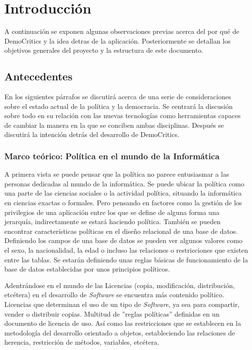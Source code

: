 \newpage
\thispagestyle{sectioned}
\chapter{Introducción}

A continuación se exponen algunas observaciones previas acerca del por qué de DemoCritics y la idea detras de la aplicación. Posteriormente se detallan los objetivos generales del proyecto y la estructura de este documento.

\section{Antecedentes}

	En los siguientes párrafos se discutirá acerca de una serie de consideraciones sobre el estado actual de la política y la democracia. Se centrará la discusión sobre todo en su relación con las nuevas tecnologías como herramientas capaces de cambiar la manera en la que se conciben ambas disciplinas. Después se discutirá la intención detrás del desarrollo de DemoCritics.

	\subsection{Marco teórico: Política en el mundo de la Informática}

	A primera vista se puede pensar que la política no parece entusiasmar a las personas dedicadas al mundo de la informática. Se puede ubicar la política como una parte de las ciencias sociales o la actividad política, situando la informática en ciencias exactas o formales. Pero pensando en factores como la gestión de los privilegios de una aplicación entre los que se define de alguna forma una jerarquía, indirectamente se estará haciendo política. También se pueden encontrar características políticas en el diseño relacional de una base de datos. Definiendo los campos de una base de datos se pueden ver algunos valores como el sexo, la nacionalidad, la edad o incluso las relaciones o restricciones que existen entre las tablas. Se estarán definiendo unas reglas básicas de funcionamiento de la base de datos establecidas por unos principios políticos.

	Adentrándose en el mundo de las Licencias (copia, modificación, distribución, etcétera) en el desarrollo de \textit{Software} se encuentra más contenido político. Licencias que determinan el uso de un tipo de \textit{Software}, ya sea para compartir, vender o distribuir copias. Multitud de ''reglas políticas'' definidas en un documento de licencia de uso. Así como las restricciones que se establecen en la metodología del desarrollo orientado a objetos, estableciendo las relaciones de herencia, restricción de métodos, variables, etcétera.

